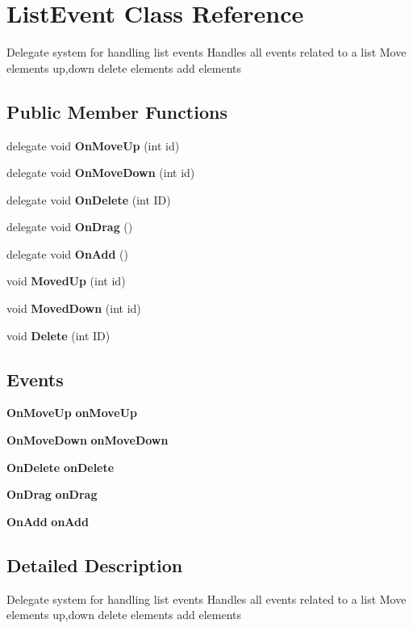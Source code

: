 \section{List\+Event Class Reference}
\label{class_list_event}


Delegate system for handling list events Handles all events related to a list Move elements up,down delete elements add elements  


\subsection*{Public Member Functions}
\begin{DoxyCompactItemize}
\item 
delegate void \textbf{ On\+Move\+Up} (int id)
\item 
delegate void \textbf{ On\+Move\+Down} (int id)
\item 
delegate void \textbf{ On\+Delete} (int ID)
\item 
delegate void \textbf{ On\+Drag} ()
\item 
delegate void \textbf{ On\+Add} ()
\item 
void \textbf{ Moved\+Up} (int id)
\item 
void \textbf{ Moved\+Down} (int id)
\item 
void \textbf{ Delete} (int ID)
\end{DoxyCompactItemize}
\subsection*{Events}
\begin{DoxyCompactItemize}
\item 
\textbf{ On\+Move\+Up} \textbf{ on\+Move\+Up}
\item 
\textbf{ On\+Move\+Down} \textbf{ on\+Move\+Down}
\item 
\textbf{ On\+Delete} \textbf{ on\+Delete}
\item 
\textbf{ On\+Drag} \textbf{ on\+Drag}
\item 
\textbf{ On\+Add} \textbf{ on\+Add}
\end{DoxyCompactItemize}


\subsection{Detailed Description}
Delegate system for handling list events Handles all events related to a list Move elements up,down delete elements add elements 



